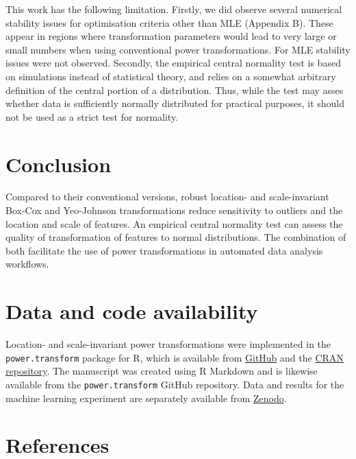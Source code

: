 \documentclass[
  a4paper,
]{article}
\begin{document}
This work has the following limitation. Firstly, we did observe several
numerical stability issues for optimisation criteria other than MLE
(Appendix B). These appear in regions where transformation parameters
would lead to very large or small numbers when using conventional power
transformations. For MLE stability issues were not observed. Secondly,
the empirical central normality test is based on simulations instead of
statistical theory, and relies on a somewhat arbitrary definition of the
central portion of a distribution. Thus, while the test may asses
whether data is sufficiently normally distributed for practical
purposes, it should not be used as a strict test for normality.

\section{Conclusion}\label{conclusion}

Compared to their conventional versions, robust location- and
scale-invariant Box-Cox and Yeo-Johnson transformations reduce
sensitivity to outliers and the location and scale of features. An
empirical central normality test can assess the quality of
transformation of features to normal distributions. The combination of
both facilitate the use of power transformations in automated data
analysis workflows.

\section{Data and code availability}\label{data-and-code-availability}

Location- and scale-invariant power transformations were implemented in
the \texttt{power.transform} package for R, which is available from
\href{https://github.com/oncoray/power.transform}{GitHub} and the
\href{https://cran.r-project.org/package=power.transform}{CRAN
repository}. The manuscript was created using R Markdown and is likewise
available from the \texttt{power.transform} GitHub repository. Data and
results for the machine learning experiment are separately available
from \href{https://doi.org/10.5281/zenodo.13736671}{Zenodo}.

\section*{References}\label{references}
\end{document}
